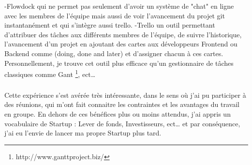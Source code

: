-Flowdock qui ne permet pas seulement d'avoir un système de "chat" en ligne avec les membres de l'équipe mais aussi de voir l'avancement du projet git instantanément et qui s'intègre aussi trello.
\newline
-Trello un outil permettant d'attribuer des tâches aux différents membres de l'équipe, de suivre l'historique, l'avancement d'un projet en ajoutant des cartes aux développeurs Frontend ou Backend comme (doing, done and later) et d'assigner chacun à ces cartes.
Personnellement, je trouve cet outil plus efficace qu'un gestionnaire de tâches classiques comme Gant \footnote{http://www.ganttproject.biz/}, ect…
\subparagraph{}
Cette expérience s’est avérée très intéressante, dans le sens où j’ai pu participer à des réunions, qui m’ont fait connaitre les contraintes et les avantages du travail en groupe.
En dehors de ces bénéfices plus ou moins attendus, j'ai appris un vocabulaire de Startup : Lever de fonds, Investisseurs, ect… et par conséquence, j'ai eu l'envie de lancer ma propre Startup plus tard.

